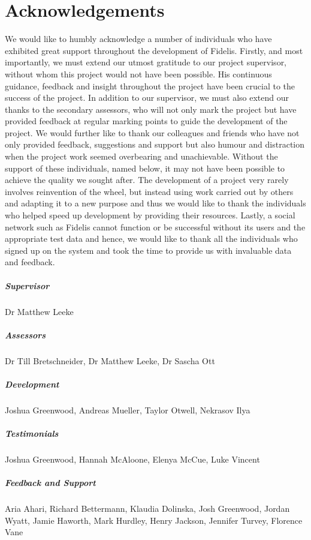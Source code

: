 \chapter*{Acknowledgements}

We would like to humbly acknowledge a number of individuals who have exhibited great support throughout the development of Fidelis. Firstly, and most importantly, we must extend our utmost gratitude to our project supervisor, without whom this project would not have been possible. His continuous guidance, feedback and insight throughout the project have been crucial to the success of the project. In addition to our supervisor, we must also extend our thanks to the secondary assessors, who will not only mark the project but have provided feedback at regular marking points to guide the development of the project.  We would further like to thank our colleagues and friends who have not only provided feedback, suggestions and support but also humour and distraction when the project work seemed overbearing and unachievable. Without the support of these individuals, named below, it may not have been possible to achieve the quality we sought after. The development of a project very rarely involves reinvention of the wheel, but instead using work carried out by others and adapting it to a new purpose and thus we would like to thank the individuals who helped speed up development by providing their resources. Lastly, a social network such as Fidelis cannot function or be successful without its users and the appropriate test data and hence, we would like to thank all the individuals who signed up on the system and took the time to provide us with invaluable data and feedback.

\paragraph{Supervisor} Dr Matthew Leeke

\paragraph{Assessors} Dr Till Bretschneider, Dr Matthew Leeke, Dr Sascha Ott

\paragraph{Development} Joshua Greenwood, Andreas Mueller, Taylor Otwell, Nekrasov Ilya

\paragraph{Testimonials} Joshua Greenwood, Hannah McAloone, Elenya McCue, Luke Vincent

\paragraph{Feedback and Support} Aria Ahari, Richard Bettermann, Klaudia Dolinska, Josh Greenwood, Jordan Wyatt, Jamie Haworth, Mark Hurdley, Henry Jackson, Jennifer Turvey, Florence Vane